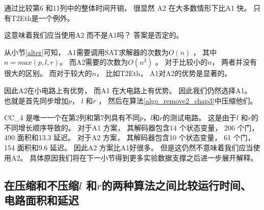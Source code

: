 通过比较第6 和11列中的整体时间开销，
很显然
A2 在大多数情形下比A1 快。
只有T2Eth是一个例外。

这意味着我们应当使用A2 而不是A1吗？
答案是否定的。

从小节\ref{alter}可知，
A1需要调用SAT求解器的次数为$O(n)$ ，
其中$n=max(p,l,r)$。
而A2需要的次数为$O(n^3)$ 。
对于比较小的$n$，
两者并没有很大的区别。
而对于较大的$n$，
比如T2Eth，
A1对A2的优势是显著的。

因此A2在小电路上有优势，
而A1 在大电路上有优势。
因此我们仍然选择A1。
也就是首先同步增加$p$， $l$ 和$r$ ，
然后在算法\ref{algo_remove2_chap3}中压缩他们。

CC\_4 是唯一一个在第2列和第7列具有不同$p$，$l$和$r$的测试电路。
这是由于$l$ 和$r$的不同增长顺序导致的。
对于A1 方案，
其解码器包含14 个状态变量， 206 个门， 490 面积和13.3 延迟。
对于A2 方案，
其解码器包含10 个状态变量， 61 个门， 154 面积和9.6 延迟。
因此A2 方案比A1好很多。
但是这仍然不意味着我们应当使用A2。
具体原因我们将在下一小节得到更多实验数据支撑之后进一步展开解释。

\subsection{在压缩和不压缩$l$ 和$r$的两种算法之间比较运行时间、电路面积和延迟}\label{subsec_min}

